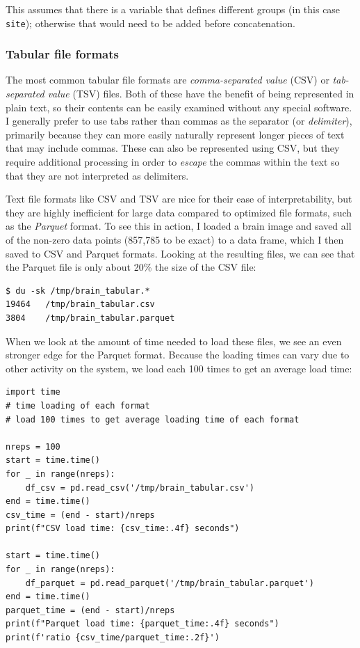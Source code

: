 This assumes that there is a variable that defines different groups (in this case \texttt{site}); otherwise that would need to be added before concatenation.

\subsubsection{Tabular file formats}

The most common tabular file formats are \textit{comma-separated value} (CSV) or \textit{tab-separated value} (TSV) files.  Both of these have the benefit of being represented in plain text, so their contents can be easily examined without any special software.  I generally prefer to use tabs rather than commas as the separator (or \textit{delimiter}), primarily because they can more easily naturally represent longer pieces of text that may include commas. These can also be represented using CSV, but they require additional processing in order to \textit{escape} the commas within the text so that they are not interpreted as delimiters.

Text file formats like CSV and TSV are nice for their ease of interpretability, but they are highly inefficient for large data compared to optimized file formats, such as the \textit{Parquet} format.  To see this in action, I loaded a brain image and saved all of the non-zero data points (857,785 to be exact) to a data frame, which I then saved to CSV and Parquet formats.  Looking at the resulting files, we can see that the Parquet file is only about 20\% the size of the CSV file:

\begin{lstlisting}[style=shellshort]
$ du -sk /tmp/brain_tabular.*
19464	/tmp/brain_tabular.csv
3804	/tmp/brain_tabular.parquet
\end{lstlisting}

When we look at the amount of time needed to load these files, we see an even stronger edge for the Parquet format. Because the loading times can vary due to other activity on the system, we load each 100 times to get an average load time:

\begin{lstlisting}[style=Python]
import time
# time loading of each format
# load 100 times to get average loading time of each format

nreps = 100
start = time.time()
for _ in range(nreps):
    df_csv = pd.read_csv('/tmp/brain_tabular.csv')
end = time.time()
csv_time = (end - start)/nreps
print(f"CSV load time: {csv_time:.4f} seconds")

start = time.time()
for _ in range(nreps):
    df_parquet = pd.read_parquet('/tmp/brain_tabular.parquet')
end = time.time()
parquet_time = (end - start)/nreps
print(f"Parquet load time: {parquet_time:.4f} seconds")
print(f'ratio {csv_time/parquet_time:.2f}')
\end{lstlisting}

